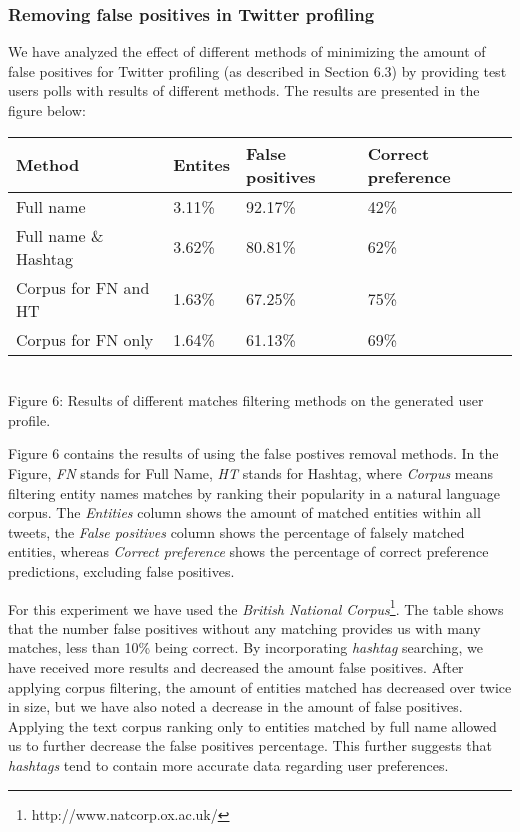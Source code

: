 \subsubsection{Removing false positives in Twitter profiling}

We have analyzed the effect of different methods of minimizing the amount of false
positives for Twitter profiling (as described in Section 6.3) by providing test users
polls with results of different methods. The results are presented in the figure below:

\begin{center}
  \begin{tabular}{ | p{4cm} | p{2cm} | p{2cm} | p{2cm} | } \hline
    Method & Entites & False positives & Correct preference \\ \hline
    Full name & 3.11\% & 92.17\% & 42\% \\ \hline
    Full name \& Hashtag & 3.62\% & 80.81\% & 62\% \\ \hline
    Corpus for FN and HT & 1.63\% & 67.25\% & 75\% \\ \hline
    Corpus for FN only & 1.64\% & 61.13\% & 69\% \\ \hline
  \end{tabular} \\
  Figure 6: Results of different matches filtering methods on the generated user profile.
\end{center}

Figure 6 contains the results of using the false postives removal methods. In the Figure,
\textit{FN} stands for Full Name, \textit{HT} stands for Hashtag, where \textit{Corpus}
means filtering entity names matches by ranking their popularity in a natural language
corpus. The \textit{Entities} column shows the amount of matched entities within all tweets,
the \textit{False positives} column shows the percentage of falsely matched
entities, whereas \textit{Correct preference} shows the percentage of correct preference predictions,
excluding false positives.

For this experiment we have used the \textit{British National Corpus}\footnote{http://www.natcorp.ox.ac.uk/}.
The table shows that the number false positives without any matching provides us with many matches, less than
10\% being correct. By incorporating \textit{hashtag} searching, we have received more results and decreased the amount
false positives. After applying corpus filtering, the amount of entities matched has decreased over twice in size,
but we have also noted a decrease in the amount of false positives. Applying the text corpus ranking only to
entities matched by full name allowed us to further decrease the false positives percentage.
This further suggests that \textit{hashtags} tend to contain more accurate data regarding user preferences.

